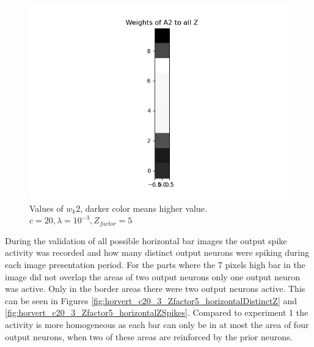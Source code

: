 \begin{figure}
  \includegraphics[width=\linewidth]{figures/horvert/horvert_c20_3_Zfactor5_priorWeight2.png}
  \caption{Values of $w_k2$, darker color means higher value. $c = 20, \lambda = 10^{-3}, Z_{factor} = 5$}
  \label{fig:wkl2}
\end{figure}

During the validation of all possible horizontal bar images the output spike activity was recorded and how many distinct output neurons were spiking during each image presentation period. For the parts where the 7 pixels high bar in the image did not overlap the areas of two output neurons only one output neuron was active. Only in the border areas there were two output neurons active. This can be seen in Figures \ref{fig:horvert_c20_3_Zfactor5_horizontalDistinctZ} and \ref{fig:horvert_c20_3_Zfactor5_horizontalZSpikes}. Compared to experiment 1 the activity is more homogeneous as each bar can only be in at most the area of four output neurons, when two of these areas are reinforced by the prior neurons.

